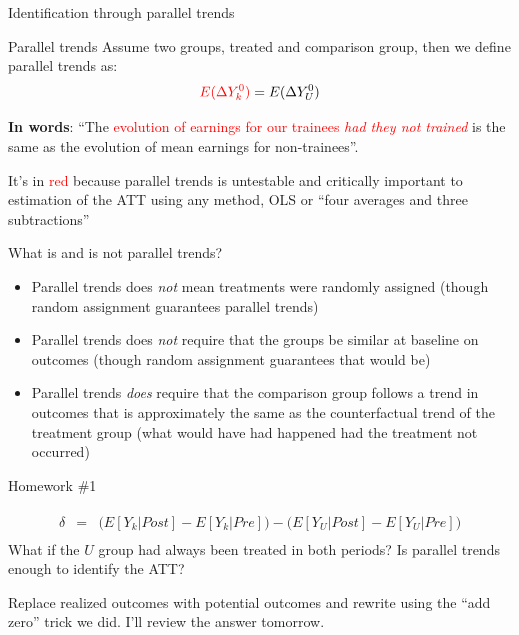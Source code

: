\documentclass{beamer}
\begin{document}
\begin{frame}{Identification through parallel trends}
	

	\begin{block}{Parallel trends}
	Assume two groups, treated and comparison group, then we define parallel trends as:	 $$\textcolor{red}{E(}\textcolor{red}{\Delta Y^0_k)} = E(\Delta Y^0_U)$$
	\end{block}

\textbf{In words}: ``The \textcolor{red}{evolution of earnings for our trainees \emph{had they not trained}} is the same as the evolution of mean earnings for non-trainees''.  

\bigskip

It's in \textcolor{red}{red} because parallel trends is untestable and critically important to estimation of the ATT using any method, OLS or ``four averages and three subtractions''

	

	
\end{frame}


\begin{frame}{What is and is not parallel trends?}

\begin{itemize}
\item Parallel trends does \emph{not} mean treatments were randomly assigned (though random assignment guarantees parallel trends)
\item Parallel trends does \emph{not} require that the groups be similar at baseline on outcomes (though random assignment guarantees that would be)
\item Parallel trends \emph{does} require that the comparison group follows a trend in outcomes that is approximately the same as the counterfactual trend of the treatment group (what would have had happened had the treatment not occurred)
\end{itemize}

\end{frame}



\begin{frame}{Homework \#1}


\begin{eqnarray*}
\widehat{\delta} &=& \bigg ( E[Y_k|Post] - E[Y_k|Pre] \bigg ) - \bigg ( E[Y_U | Post ] - E[ Y_U | Pre] \bigg) \\
\end{eqnarray*}What if the $U$ group had always been treated in both periods? Is parallel trends enough to identify the ATT?

\bigskip

Replace realized outcomes with potential outcomes and rewrite using the ``add zero'' trick we did.  I'll review the answer tomorrow.


\end{frame}
\end{document}
